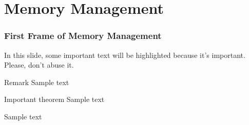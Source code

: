 \section{Memory Management}

\begin{frame}
    \frametitle{First Frame of Memory Management}
    
    In this slide, some important text will be
    \alert{highlighted} because it's important.
    Please, don't abuse it.
    
    \begin{block}{Remark}
    Sample text
    \end{block}
    
    \begin{alertblock}{Important theorem}
    Sample text
    \end{alertblock}
    
    \begin{examples}
    Sample text
    \end{examples}
    \end{frame}
    